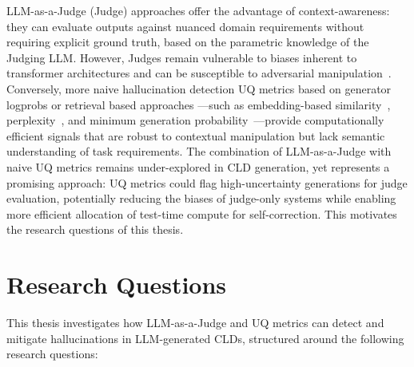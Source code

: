 LLM-as-a-Judge (Judge) approaches offer the advantage of context-awareness: they can evaluate outputs against nuanced domain requirements without requiring explicit ground truth, based on the parametric knowledge of the Judging LLM. However, Judges remain vulnerable to biases inherent to transformer architectures and can be susceptible to adversarial manipulation~\citep{li2024llms, shi2024optimization}. Conversely, more naive hallucination detection UQ metrics based on generator logprobs or retrieval based approaches ---such as embedding-based similarity~\citep{lewis2020retrieval, zhang2024causal}, perplexity~\citep{valentin2024cost, tonmoy2024comprehensive}, and minimum generation probability~\citep{varshney2023stitch}---provide computationally efficient signals that are robust to contextual manipulation but lack semantic understanding of task requirements. The combination of LLM-as-a-Judge with naive UQ metrics remains under-explored in CLD generation, yet represents a promising approach: UQ metrics could flag high-uncertainty generations for judge evaluation, potentially reducing the biases of judge-only systems while enabling more efficient allocation of test-time compute for self-correction.
This motivates the research questions of this thesis.

\section*{Research Questions}

This thesis investigates how LLM-as-a-Judge and UQ metrics can detect and mitigate hallucinations in LLM-generated CLDs, structured around the following research questions:

